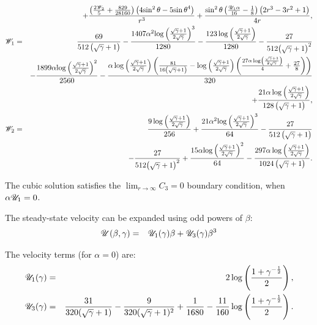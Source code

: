 \begin{eqnarray*}
\\ && + \frac{\left(\frac{2 {\mathscr{W}_2}}{5} + \frac{829}{28160}\right) \left(4 {\sin^2\theta} - 5 {\sin\theta}^4\right)}{r^3} + \frac{{\sin^2\theta} \left(\frac{{\mathscr{U}_1}\alpha}{16} - \frac{1}{8}\right) \left(2 r^3 - 3 r^2 + 1\right)}{4 r},
\\
\mathscr{W}_1 &=& \frac{69}{512 \left(\sqrt{\gamma} + 1\right)} - \frac{1407\alpha^2 {\log\left(\frac{\sqrt{\gamma} + 1}{2 \sqrt{\gamma}}\right)}^3}{1280} - \frac{123 \log\left(\frac{\sqrt{\gamma} + 1}{2 \sqrt{\gamma}}\right)}{1280} - \frac{27}{512 {\left(\sqrt{\gamma} + 1\right)}^2} \\ && -
\frac{1899\alpha {\log\left(\frac{\sqrt{\gamma} + 1}{2 \sqrt{\gamma}}\right)}^2}{2560} - \frac{\alpha \log\left(\frac{\sqrt{\gamma} + 1}{2 \sqrt{\gamma}}\right) \left(\frac{81}{16 \left(\sqrt{\gamma} + 1\right)} - \log\left(\frac{\sqrt{\gamma} + 1}{2 \sqrt{\gamma}}\right) \left(\frac{27\alpha \log\left(\frac{\sqrt{\gamma} + 1}{2 \sqrt{\gamma}}\right)}{4} + \frac{27}{8}\right)\right)}{320} \\ && + 
\frac{21\alpha \log\left(\frac{\sqrt{\gamma} + 1}{2 \sqrt{\gamma}}\right)}{128 \left(\sqrt{\gamma} + 1\right)},
\\
\mathscr{W}_2 &=& \frac{9 \log\left(\frac{\sqrt{\gamma} + 1}{2 \sqrt{\gamma}}\right)}{256} + \frac{21\alpha^2 {\log\left(\frac{\sqrt{\gamma} + 1}{2 \sqrt{\gamma}}\right)}^3}{64} - \frac{27}{512 \left(\sqrt{\gamma} + 1\right)} 
\\ && 
- \frac{27}{512 {\left(\sqrt{\gamma} + 1\right)}^2} + \frac{15\alpha {\log\left(\frac{\sqrt{\gamma} + 1}{2 \sqrt{\gamma}}\right)}^2}{64} 
- \frac{297\alpha \log\left(\frac{\sqrt{\gamma} + 1}{2 \sqrt{\gamma}}\right)}{1024 \left(\sqrt{\gamma} + 1\right)}.
\end{eqnarray*}

The cubic solution satisfies the $\lim_{r\rightarrow\infty}C_3 = 0$ boundary condition, 
when $\alpha\mathscr{U}_1 = 0$.

The steady-state velocity can be expanded using odd powers of $\beta$:
\begin{eqnarray}
\mathscr{U}(\beta, \gamma) &=& \mathscr{U}_1(\gamma) \beta + \mathscr{U}_3(\gamma) \beta^3
\end{eqnarray}

The velocity terms (for $\alpha = 0$) are:
\begin{eqnarray}
\mathscr{U}_1(\gamma) &=& 2 \log \left(\frac{1 + \gamma^{-\frac{1}{2}}}{2}\right), \\
\mathscr{U}_3(\gamma) &=& \frac{31}{320(\sqrt\gamma + 1)} - \frac{9}{320(\sqrt\gamma + 1)^2} + \frac{1}{1680} - \frac{11}{160} \log \left(\frac{1 + \gamma^{-\frac{1}{2}}}{2}\right).
\end{eqnarray}

